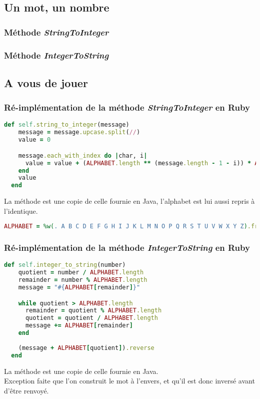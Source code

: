 \documentclass[a4paper,10pt]{article}
\begin{document}
\subsection{Un mot, un nombre}
\subsubsection{Méthode \textit{StringToInteger}}
\subsubsection{Méthode \textit{IntegerToString}}

\clearpage
\subsection{A vous de jouer}
\subsubsection{Ré-implémentation de la méthode \textit{StringToInteger} en Ruby}
\begin{lstlisting}[language=Ruby]
  def self.string_to_integer(message)
    message = message.upcase.split(//)
    value = 0

    message.each_with_index do |char, i|
      value = value + (ALPHABET.length ** (message.length - 1 - i)) * ALPHABET.index(char)
    end
    value
  end
\end{lstlisting}
La méthode est une copie de celle fournie en Java, l'alphabet est lui aussi repris à l'identique.\\
\begin{lstlisting}[language=Ruby]
  ALPHABET = %w(. A B C D E F G H I J K L M N O P Q R S T U V W X Y Z).freeze
\end{lstlisting}
\bigskip

\subsubsection{Ré-implémentation de la méthode \textit{IntegerToString} en Ruby}
\begin{lstlisting}[language=Ruby]
  def self.integer_to_string(number)
    quotient = number / ALPHABET.length
    remainder = number % ALPHABET.length
    message = "#{ALPHABET[remainder]}"

    while quotient > ALPHABET.length
      remainder = quotient % ALPHABET.length
      quotient = quotient / ALPHABET.length
      message += ALPHABET[remainder]
    end
    
    (message + ALPHABET[quotient]).reverse
  end
\end{lstlisting}
La méthode est une copie de celle fournie en Java.\\
Exception faite que l'on construit le mot à l'envers, et qu'il est donc inversé avant d'être renvoyé. 
\end{document}
